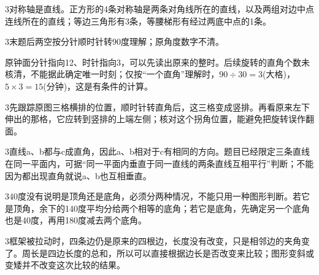 \documentclass[multi=snippet,border={5bp 20bp 5bp 5bp}]{standalone}
\newenvironment{snippet}[3]{\begin{minipage}{#1bp}\color{answerred}\fontsize{#2}{#3}\selectfont\raggedright}{\end{minipage}}
\begin{document}
\begin{snippet}{505}{11.5}{14}\begin{multicols}{3}\raggedcolumns 对称轴是直线。正方形的4条对称轴是两条对角线所在的直线，以及两组对边中点连线所在的直线；等边三角形有3条，等腰梯形有经过两底中点的1条。\end{multicols}\end{snippet}
\begin{snippet}{505}{11.5}{14}\begin{multicols}{3}\raggedcolumns 末题后两空按分针顺时针转90度理解；原角度数字不清。\par 原钟面分针指向12、时针指向3，可以先读出原来的整时。后续旋转的直角个数未核清，不能据此确定唯一时刻；仅按“一个直角”理解时，\(90\div30=3\)\allowbreak (大格)，\(5\times3=15\)\allowbreak (分钟)，这是有条件的计算。\end{multicols}\end{snippet}
\begin{snippet}{505}{11.5}{14}\begin{multicols}{3}\raggedcolumns 先跟踪原图三格横排的位置，顺时针转直角后，这三格变成竖排。再看原来左下伸出的那格，它应转到竖排的上端左侧；核对这个拐角位置，能避免把旋转误作翻面。\end{multicols}\end{snippet}
\begin{snippet}{505}{11.5}{14}\begin{multicols}{3}\raggedcolumns 直线a、b都与c成直角，因此a、b相对于c有相同的方向。题目已经限定三条直线在同一平面内，可据“同一平面内垂直于同一直线的两条直线互相平行”判断；不能因为都出现直角就说a、b也互相垂直。\end{multicols}\end{snippet}
\begin{snippet}{505}{11.5}{14}\begin{multicols}{3}\raggedcolumns 40度没有说明是顶角还是底角，必须分两种情况，不能只用一种图形判断。若它是顶角，余下的140度平均分给两个相等的底角；若它是底角，先确定另一个底角也是40度，再用180度减去两个底角。\end{multicols}\end{snippet}
\begin{snippet}{505}{11.5}{14}\begin{multicols}{3}\raggedcolumns 框架被拉动时，四条边仍是原来的四根边，长度没有改变，只是相邻边的夹角变了。周长是四边长度的总和，所以可以直接根据边长是否改变来比较；图形变斜或变矮并不改变这次比较的结果。\end{multicols}\end{snippet}
\end{document}
